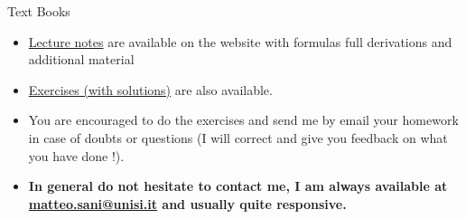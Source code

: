 \documentclass{beamer}
\begin{document}
\begin{frame}{Text Books}
  \begin{itemize}
    \item \href{https://drive.google.com/file/d/1GnlyuB4KkUbzqL7tf6nju-ZEqnfQrRa4/view?usp=drive_link}{Lecture notes} are available on the website with formulas full derivations and additional material
    \item \href{https://drive.google.com/file/d/1wrOj1xTehJvd4UCDCVl7WnUFST16IZJP/view?usp=drive_link}{Exercises (with solutions)} are also available. 
    \item You are encouraged to do the exercises and send me by email your homework in case of doubts or questions (I will correct and give you feedback on what you have done !).
    \item \textbf{In general do not hesitate to contact me, I am always available at \href{mailto:matteo.sani@unisi.it}{matteo.sani@unisi.it} and usually quite responsive.}
  \end{itemize}
\end{frame}
\end{document}
